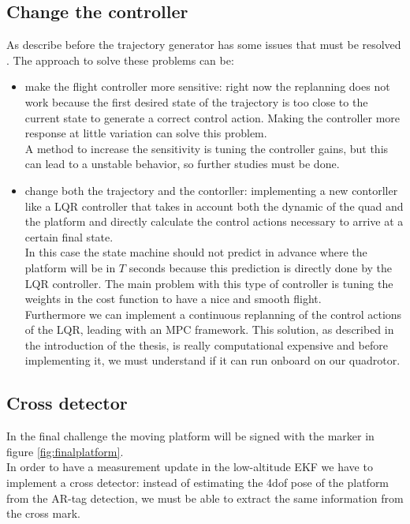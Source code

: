 \subsection{Change the controller}
As describe before the trajectory generator has some issues that must be resolved \label{sec:trajectory_problem}. The approach to solve these problems can be:
\begin{itemize}
\item make the flight controller more sensitive: right now the replanning does not work because the first desired state of the trajectory is too close to the current state to generate a correct control action. Making the controller more response at little variation can solve this problem.\\
A method to increase the sensitivity is tuning the controller gains, but this can lead to a unstable behavior, so further studies must be done.
\item change both the trajectory and the contorller: implementing a new contorller like a LQR controller \cite{wiki_lqr} that takes in account both the dynamic of the quad and the platform and directly calculate the control actions necessary to arrive at a certain final state.\\  In this case the state machine should not predict in advance where the platform will be in $T$ seconds because this prediction is directly done by the LQR controller. The main problem with this type of controller is tuning the weights in the cost function to have a nice and smooth flight. \\ 
Furthermore we can implement a continuous replanning of the control actions of the LQR, leading with an MPC framework. This solution, as described in the introduction of the thesis, is really computational expensive and before implementing it, we must understand if it can run onboard on our quadrotor.
\end{itemize} 

\subsection{Cross detector}
In the final challenge the moving platform will be signed with the marker in figure \ref{fig:finalplatform}. \\
In order to have a measurement update in the low-altitude EKF we have to implement a cross detector: instead of estimating the 4dof pose of the platform from the AR-tag detection, we must be able to extract the same information from the cross mark.\\

